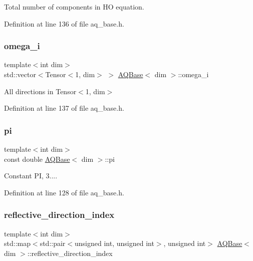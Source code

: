 Total number of components in HO equation. 



Definition at line 136 of file aq\+\_\+base.\+h.

\mbox{\label{class_a_q_base_a07aaf517b03be3f8405fd4063cf59231}} 
\subsubsection{\texorpdfstring{omega\+\_\+i}{omega\_i}}
{\footnotesize\ttfamily template$<$int dim$>$ \\
std\+::vector$<$Tensor$<$1, dim$>$ $>$ \hyperlink{class_a_q_base}{A\+Q\+Base}$<$ dim $>$\+::omega\+\_\+i\hspace{0.3cm}{\ttfamily [protected]}}



All directions in Tensor$<$1, dim$>$ 



Definition at line 137 of file aq\+\_\+base.\+h.

\mbox{\label{class_a_q_base_a002ce18f617db787616e60fba67899a9}} 
\subsubsection{\texorpdfstring{pi}{pi}}
{\footnotesize\ttfamily template$<$int dim$>$ \\
const double \hyperlink{class_a_q_base}{A\+Q\+Base}$<$ dim $>$\+::pi\hspace{0.3cm}{\ttfamily [protected]}}



Constant PI, 3.... 



Definition at line 128 of file aq\+\_\+base.\+h.

\mbox{\label{class_a_q_base_a9aa6c274dd0ef167528bbec76637cc22}} 
\subsubsection{\texorpdfstring{reflective\+\_\+direction\+\_\+index}{reflective\_direction\_index}}
{\footnotesize\ttfamily template$<$int dim$>$ \\
std\+::map$<$std\+::pair$<$unsigned int, unsigned int$>$, unsigned int$>$ \hyperlink{class_a_q_base}{A\+Q\+Base}$<$ dim $>$\+::reflective\+\_\+direction\+\_\+index\hspace{0.3cm}{\ttfamily [protected]}}

